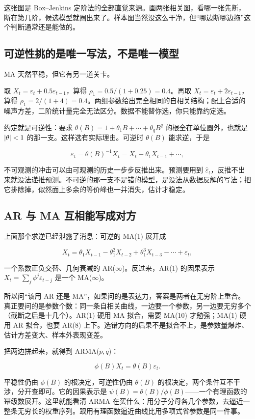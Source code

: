 这张图是 Box--Jenkins 定阶法的全部直觉来源。画两张相关图，看哪一张先断，断在第几阶，候选模型就圈出来了。样本图当然没这么干净，但``哪边断哪边拖''这个判断通常还是能做的。

\subsection{可逆性挑的是唯一写法，不是唯一模型}

MA 天然平稳，但它有另一道关卡。

取 \(X_t=\varepsilon_t+0.5\varepsilon_{t-1}\)，算得 \(\rho_1=0.5/(1+0.25)=0.4\)。再取 \(X_t=\varepsilon_t+2\varepsilon_{t-1}\)，算得 \(\rho_1=2/(1+4)=0.4\)。两组参数给出完全相同的自相关结构；配上合适的噪声方差，二阶统计量完全无法区分。数据不能替你选，你只能靠约定选。

约定就是可逆性：要求 \(\theta(B)=1+\theta_1B+\cdots+\theta_qB^q\) 的根全在单位圆外，也就是 \(\left|\theta\right|<1\) 的那一支。这样选有实际理由。可逆时 \(\theta(B)\) 能求逆，于是

\[
\varepsilon_t=\theta(B)^{-1}X_t=X_t-\theta_1X_{t-1}+\cdots,
\]

不可观测的冲击可以由可观测的历史一步步反推出来。预测要用到 \(\hat\varepsilon_t\)，反推不出来就没法递推预测。不可逆的那一支不是错的模型，是没法从数据反解的写法；把它排除掉，似然面上多余的等价峰也一并消失，估计才稳定。

\subsection{AR 与 MA 互相能写成对方}

上面那个求逆已经泄露了消息：可逆的 MA(1) 展开成

\[
X_t=\theta_1 X_{t-1}-\theta_1^2X_{t-2}+\theta_1^3X_{t-3}-\cdots+\varepsilon_t,
\]

一个系数正负交替、几何衰减的 AR(\(\infty\))。反过来，AR(1) 的因果表示 \(X_t=\sum_j\phi^j\varepsilon_{t-j}\) 是一个 MA(\(\infty\))。

所以问``该用 AR 还是 MA''，如果问的是表达力，答案是两者在无穷阶上重合。真正要问的是参数个数：同一条自相关曲线，一边要一个参数，另一边要无穷多个（截断之后是十几个）。AR(1) 硬用 MA 拟合，需要 MA(10) 才勉强；MA(1) 硬用 AR 拟合，也要 AR(8) 上下。选错方向的后果不是拟合不上，是参数量爆炸、估计方差变大、样本外表现变差。

把两边拼起来，就得到 ARMA(\(p,q\))：

\[
\phi(B)X_t=\theta(B)\varepsilon_t.
\]

平稳性仍由 \(\phi(B)\) 的根决定，可逆性仍由 \(\theta(B)\) 的根决定，两个条件互不干涉，分开查即可。它的因果表示是 \(\psi(B)=\theta(B)/\phi(B)\)——一个有理函数的幂级数展开。这里就能看清 ARMA 在买什么：用分子分母各几个参数，去逼近一整条无穷长的权重序列。跟用有理函数逼近曲线比用多项式省参数是同一件事。

